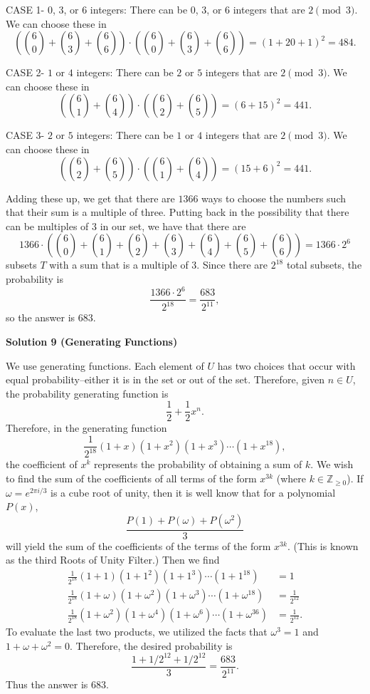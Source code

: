\begin{enumerate}
 CASE 1- $0$, $3$, or $6$ integers:  There can be $0$, $3$, or $6$ integers that are $2\pmod3$.  We can choose these in 
 \[\left(\binom60+\binom63+\binom66\right)\cdot\left(\binom60+\binom63+\binom66\right)=(1+20+1)^2=484.\]

 CASE 2- $1$ or $4$ integers:  There can be $2$ or $5$ integers that are $2\pmod3$.  We can choose these in 
 \[\left(\binom61+\binom64\right)\cdot\left(\binom62+\binom65\right)=(6+15)^2=441.\]

 CASE 3- $2$ or $5$ integers:  There can be $1$ or $4$ integers that are $2\pmod3$.  We can choose these in 
 \[\left(\binom62+\binom65\right)\cdot\left(\binom61+\binom64\right)=(15+6)^2=441.\]

 Adding these up, we get that there are $1366$ ways to choose the numbers such that their sum is a multiple of three.  Putting back in the possibility that there can be multiples of $3$ in our set, we have that there are 
 \[1366\cdot\left(\binom60+\binom61+\binom62+\binom63+\binom64+\binom65+\binom66\right)=1366\cdot2^6\] subsets $T$ with a sum that is a multiple of $3$.  Since there are $2^{18}$ total subsets, the probability is 
 \[\frac{1366\cdot2^6}{2^{18}}=\frac{683}{2^{11}},\] so the answer is $\boxed{683}$.

 



\textbf{Solution 9 (Generating Functions)}

We use generating functions. Each element of $U$ has two choices that occur with equal probability--either it is in the set or out of the set. Therefore, given $n\in U$, the probability generating function is
 \[\frac{1}{2}+\frac{1}{2}x^n.\]Therefore, in the generating function
 \[\frac{1}{2^{18}}(1+x)(1+x^2)(1+x^3)\cdots (1+x^{18}),\]the coefficient of $x^k$ represents the probability of obtaining a sum of $k$. We wish to find the sum of the coefficients of all terms of the form $x^{3k}$ (where $k \in \mathbb{Z}_{\geq0}$). If $\omega=e^{2\pi i/3}$ is a cube root of unity, then it is well know that for a polynomial $P(x)$, 
 \[\frac{P(1)+P(\omega)+P(\omega^2)}{3}\]will yield the sum of the coefficients of the terms of the form $x^{3k}$. (This is known as the third Roots of Unity Filter.) Then we find
 \begin{align*} \frac{1}{2^{18}}(1+1)(1+1^2)(1+1^3)\cdots (1+1^{18})&=1\\\frac{1}{2^{18}}(1+\omega)(1+\omega^2)(1+\omega^3)\cdots (1+\omega^{18})&=\frac{1}{2^{12}}\\\frac{1}{2^{18}}(1+\omega^2)(1+\omega^4)(1+\omega^6)\cdots (1+\omega^{36})&=\frac{1}{2^{12}}. \end{align*}
To evaluate the last two products, we utilized the facts that $\omega^3=1$ and $1+\omega+\omega^2=0$. Therefore, the desired probability is
 \[\frac{1+1/2^{12}+1/2^{12}}{3}=\frac{683}{2^{11}}.\]Thus the answer is $\boxed{683}$.


\end{enumerate}
